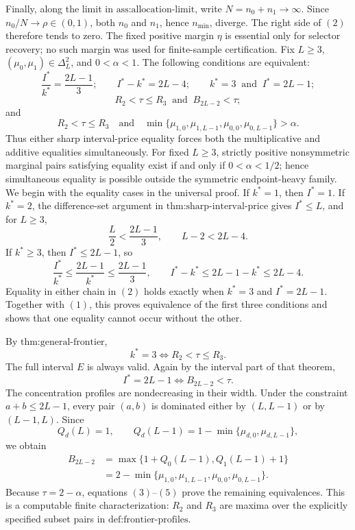 Finally, along the limit in \(\text{ass:allocation-limit}\), write \(N=n_0+n_1\to\infty\).  Since \(n_0/N\to\rho\in(0,1)\), both \(n_0\) and \(n_1\), hence \(n_{\min}\), diverge.  The right side of \((2)\) therefore tends to zero.  The fixed positive margin \(\eta\) is essential only for selector recovery; no such margin was used for finite-sample certification.
Fix \(L\geq3\), \((\mu_0,\mu_1)\in\Delta_L^2\), and \(0<\alpha<1\).  The following conditions are equivalent:
\[
\frac{I^*}{k^*}=\frac{2L-1}{3};
\qquad
I^*-k^*=2L-4;
\qquad
k^*=3\ \text{ and }\ I^*=2L-1;
\]
\[
R_2<\tau\leq R_3\ \text{ and }\ B_{2L-2}<\tau;
\]
and
\[
R_2<\tau\leq R_3
\quad\text{and}\quad
\min\{\mu_{1,0},\mu_{1,L-1},\mu_{0,0},\mu_{0,L-1}\}>\alpha.
\]
Thus either sharp interval-price equality forces both the multiplicative and additive equalities simultaneously.  For fixed \(L\geq3\), strictly positive nonsymmetric marginal pairs satisfying equality exist if and only if \(0<\alpha<1/2\); hence simultaneous equality is possible outside the symmetric endpoint-heavy family.
We begin with the equality cases in the universal proof.  If \(k^*=1\), then \(I^*=1\).  If \(k^*=2\), the difference-set argument in \(\text{thm:sharp-interval-price}\) gives \(I^*\leq L\), and for \(L\geq3\),
\[
\frac L2<\frac{2L-1}{3},
\qquad
L-2<2L-4. \tag{1}
\]
If \(k^*\geq3\), then \(I^*\leq2L-1\), so
\[
\frac{I^*}{k^*}\leq\frac{2L-1}{k^*}\leq\frac{2L-1}{3},
\qquad
I^*-k^*\leq2L-1-k^*\leq2L-4. \tag{2}
\]
Equality in either chain in \((2)\) holds exactly when \(k^*=3\) and \(I^*=2L-1\).  Together with \((1)\), this proves equivalence of the first three conditions and shows that one equality cannot occur without the other.

By \(\text{thm:general-frontier}\),
\[
k^*=3\iff R_2<\tau\leq R_3. \tag{3}
\]
The full interval \(E\) is always valid.  Again by the interval part of that theorem,
\[
I^*=2L-1\iff B_{2L-2}<\tau. \tag{4}
\]
The concentration profiles are nondecreasing in their width.  Under the constraint \(a+b\leq2L-1\), every pair \((a,b)\) is dominated either by \((L,L-1)\) or by \((L-1,L)\).  Since
\[
Q_d(L)=1,
\qquad
Q_d(L-1)=1-\min\{\mu_{d,0},\mu_{d,L-1}\},
\]
we obtain
\[
\begin{aligned}
B_{2L-2}
&=\max\{1+Q_0(L-1),Q_1(L-1)+1\}\\
&=2-\min\{\mu_{1,0},\mu_{1,L-1},\mu_{0,0},\mu_{0,L-1}\}.
\end{aligned} \tag{5}
\]
Because \(\tau=2-\alpha\), equations \((3)\)--\((5)\) prove the remaining equivalences.  This is a computable finite characterization: \(R_2\) and \(R_3\) are maxima over the explicitly specified subset pairs in \(\text{def:frontier-profiles}\).

